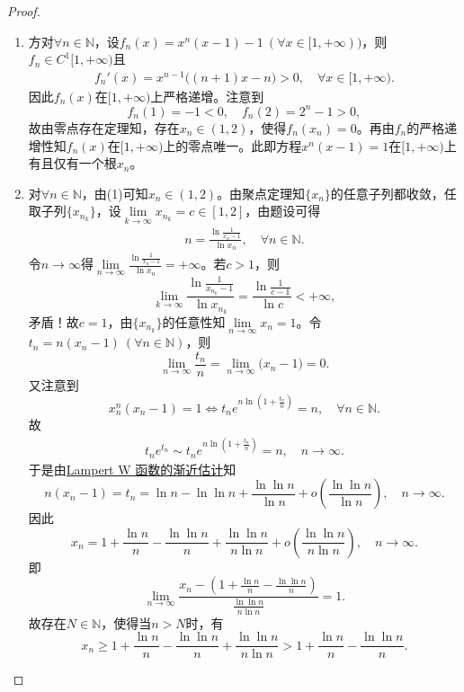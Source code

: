 \documentclass[../../main.tex]{subfiles}%
\begin{document}
\begin{proof}
\begin{enumerate}[(1)]
\item 方对$\forall n\in \mathbb{N}$，设$f_n(x)=x^n(x-1)-1\ (\forall x\in [1,+\infty))$，则$f_n\in C^1[1,+\infty)$且
\begin{align*}
f_{n}'(x)=x^{n-1}\big((n+1)x-n\big)>0,\quad \forall x\in [1,+\infty).
\end{align*}
因此$f_n(x)$在$[1,+\infty)$上严格递增。注意到
$$f_n(1)=-1<0,\quad f_n(2)=2^n-1>0,$$
故由零点存在定理知，存在$x_n\in (1,2)$，使得$f_n(x_n)=0$。再由$f_n$的严格递增性知$f_n(x)$在$[1,+\infty)$上的零点唯一。此即方程$x^n(x-1)=1$在$[1,+\infty)$上有且仅有一个根$x_n$。

\item 对$\forall n\in \mathbb{N}$，由(1)可知$x_n\in (1,2)$。由聚点定理知$\{x_n\}$的任意子列都收敛，任取子列$\{x_{n_k}\}$，设$\lim\limits_{k\rightarrow \infty}x_{n_k}=c\in [1,2]$，由题设可得
\begin{align}
n=\frac{\ln \frac{1}{x_n-1}}{\ln x_n},\quad \forall n\in \mathbb{N}. \label{eq:lab310xyz}
\end{align}
令$n\rightarrow \infty$得$\lim\limits_{n\rightarrow \infty}\frac{\ln \frac{1}{x_n-1}}{\ln x_n}=+\infty$。若$c>1$，则
$$\lim\limits_{k\rightarrow \infty}\frac{\ln \frac{1}{x_{n_k}-1}}{\ln x_{n_k}}=\frac{\ln \frac{1}{c-1}}{\ln c}<+\infty,$$
矛盾！故$c=1$，由$\{x_{n_k}\}$的任意性知$\lim\limits_{n\rightarrow \infty}x_n=1$。令$t_n=n(x_n-1)\ (\forall n\in \mathbb{N})$，则
$$\lim\limits_{n\rightarrow \infty}\frac{t_n}{n}=\lim\limits_{n\rightarrow \infty}\big(x_n-1\big)=0.$$
又注意到
$$x_{n}^{n}(x_n-1)=1\Longleftrightarrow t_ne^{n\ln \left(1+\frac{t_n}{n}\right)}=n,\quad \forall n\in \mathbb{N}.$$
故
\begin{align*}
t_ne^{t_n}\sim t_ne^{n\ln \left(1+\frac{t_n}{n}\right)}=n,\quad n\rightarrow \infty.
\end{align*}
于是由\hyperref[proposition:Lampert W 函数的渐近估计]{Lampert W 函数的渐近估计}知
$$n(x_n-1)=t_n=\ln n-\ln\ln n+\frac{\ln\ln n}{\ln n}+o\left( \frac{\ln\ln n}{\ln n} \right) ,\quad n\rightarrow \infty .$$
因此
$$x_n=1+\frac{\ln n}{n}-\frac{\ln\ln n}{n}+\frac{\ln\ln n}{n\ln n}+o\left( \frac{\ln\ln n}{n\ln n} \right) ,\quad n\rightarrow \infty .$$
即
$$\lim\limits_{n\rightarrow \infty}\frac{x_n-\left( 1+\frac{\ln n}{n}-\frac{\ln\ln n}{n} \right)}{\frac{\ln\ln n}{n\ln n}}=1.$$
故存在$N\in \mathbb{N}$，使得当$n>N$时，有
$$x_n\geqslant 1+\frac{\ln n}{n}-\frac{\ln\ln n}{n}+\frac{\ln\ln n}{n\ln n}>1+\frac{\ln n}{n}-\frac{\ln\ln n}{n}.$$
\end{enumerate}
\end{proof}
\end{document}
